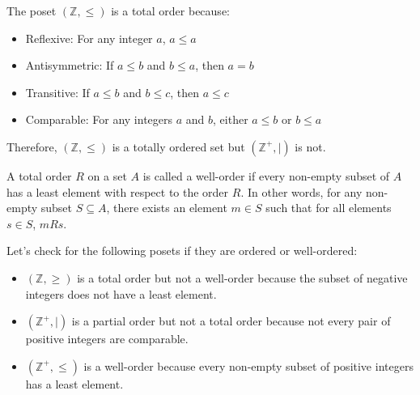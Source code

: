 \begin{eg}
    The poset $(\mathbb{Z}, \leq)$ is a total order because:
    \begin{itemize}[itemsep=1pt,label=$\circ$]
        \item Reflexive: For any integer $a$, $a \leq a$
        \item Antisymmetric: If $a \leq b$ and $b \leq a$, then $a = b$
        \item Transitive: If $a \leq b$ and $b \leq c$, then $a \leq c$
        \item Comparable: For any integers $a$ and $b$, either $a \leq b$ or $b \leq a$
    \end{itemize}
    Therefore, $(\mathbb{Z}, \leq)$ is a totally ordered set but $(\mathbb{Z}^+, \mid)$ is not.
\end{eg}

\begin{definition}
    A total order $R$ on a set $A$ is called a well-order if every non-empty subset of $A$ has a least element with respect to the order $R$. In other words, for any non-empty subset $S \subseteq A$, there exists an element $m \in S$ such that for all elements $s \in S$, $m R s$.
\end{definition}

\begin{eg}
    Let's check for the following posets if they are ordered or well-ordered:
    \begin{itemize}[itemsep=1pt,label=$\circ$]
        \item $(\mathbb{Z}, \geq)$ is a total order but not a well-order because the subset of negative integers does not have a least element.
        \item $(\mathbb{Z}^+, \mid)$ is a partial order but not a total order because not every pair of positive integers are comparable.
        \item $(\mathbb{Z}^+, \leq)$ is a well-order because every non-empty subset of positive integers has a least element.
    \end{itemize}
\end{eg}

